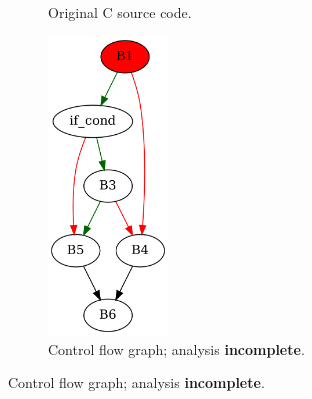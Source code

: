 \begin{figure}[htbp]
	\centering
	\begin{subfigure}[b]{0.30\textwidth}
		\centering
		
		\caption{Original C source code.}
	\end{subfigure}
	\begin{subfigure}[b]{0.50\textwidth}
		\centering
		\includegraphics[width=0.35\textwidth]{inc/appendices/examples/interval/counter-example/bool_propagation_jump/f_0002b.png}
		\caption{Control flow graph; analysis \textbf{incomplete}.}
	\end{subfigure}
\end{figure}
